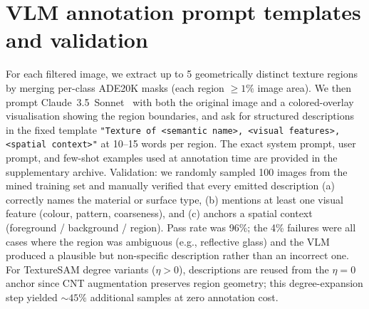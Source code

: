 \documentclass{article}
\begin{document}
\section{VLM annotation prompt templates and validation}
\label{app:annotation}
For each filtered image, we extract up to 5 geometrically distinct texture regions by merging per-class ADE20K masks (each region $\geq 1\%$ image area). We then prompt Claude~3.5~Sonnet~\cite{claude} with both the original image and a colored-overlay visualisation showing the region boundaries, and ask for structured descriptions in the fixed template \texttt{"Texture of <semantic name>, <visual features>, <spatial context>"} at 10--15 words per region. The exact system prompt, user prompt, and few-shot examples used at annotation time are provided in the supplementary archive. Validation: we randomly sampled 100 images from the mined training set and manually verified that every emitted description (a) correctly names the material or surface type, (b) mentions at least one visual feature (colour, pattern, coarseness), and (c) anchors a spatial context (foreground / background / region). Pass rate was 96\%; the 4\% failures were all cases where the region was ambiguous (e.g., reflective glass) and the VLM produced a plausible but non-specific description rather than an incorrect one. For TextureSAM degree variants ($\eta > 0$), descriptions are reused from the $\eta = 0$ anchor since CNT augmentation preserves region geometry; this degree-expansion step yielded ${\sim}45\%$ additional samples at zero annotation cost.


\newpage

\end{document}
